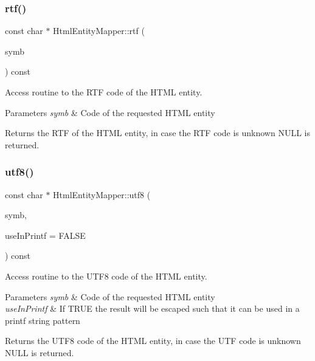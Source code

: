 \subsubsection{\texorpdfstring{rtf()}{rtf()}}
{\footnotesize\ttfamily const char $\ast$ Html\+Entity\+Mapper\+::rtf (\begin{DoxyParamCaption}\item[{Doc\+Symbol\+::\+Sym\+Type}]{symb }\end{DoxyParamCaption}) const}



Access routine to the R\+TF code of the H\+T\+ML entity. 


\begin{DoxyParams}{Parameters}
{\em symb} & Code of the requested H\+T\+ML entity \\
\hline
\end{DoxyParams}
\begin{DoxyReturn}{Returns}
the R\+TF of the H\+T\+ML entity, in case the R\+TF code is unknown {\ttfamily N\+U\+LL} is returned. 
\end{DoxyReturn}
\mbox{\label{class_html_entity_mapper_a4d0e89e08829cb5fbef56e63b145405e}} 
\subsubsection{\texorpdfstring{utf8()}{utf8()}}
{\footnotesize\ttfamily const char $\ast$ Html\+Entity\+Mapper\+::utf8 (\begin{DoxyParamCaption}\item[{Doc\+Symbol\+::\+Sym\+Type}]{symb,  }\item[{bool}]{use\+In\+Printf = {\ttfamily FALSE} }\end{DoxyParamCaption}) const}



Access routine to the U\+T\+F8 code of the H\+T\+ML entity. 


\begin{DoxyParams}{Parameters}
{\em symb} & Code of the requested H\+T\+ML entity \\
\hline
{\em use\+In\+Printf} & If T\+R\+UE the result will be escaped such that it can be used in a printf string pattern \\
\hline
\end{DoxyParams}
\begin{DoxyReturn}{Returns}
the U\+T\+F8 code of the H\+T\+ML entity, in case the U\+TF code is unknown {\ttfamily N\+U\+LL} is returned. 
\end{DoxyReturn}
\mbox{\label{class_html_entity_mapper_a852eee7360169f75ae1a24b5e503bfd9}} 
